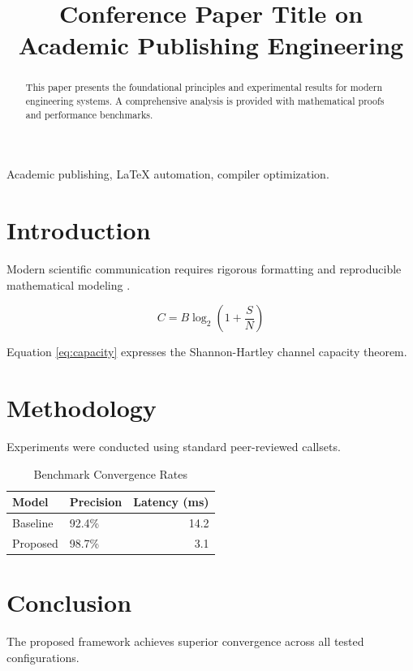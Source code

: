 \documentclass[conference]{IEEEtran}
\begin{document}
\title{Conference Paper Title on Academic Publishing Engineering}

\author{
\and
{}
}

\maketitle

\begin{abstract}
This paper presents the foundational principles and experimental results for modern engineering systems. A comprehensive analysis is provided with mathematical proofs and performance benchmarks.
\end{abstract}

\begin{IEEEkeywords}
Academic publishing, LaTeX automation, compiler optimization.
\end{IEEEkeywords}

\section{Introduction}
Modern scientific communication requires rigorous formatting and reproducible mathematical modeling \cite{shannon1948}.

\begin{equation}
  C = B \log_2\left(1 + \frac{S}{N}\right)
  \label{eq:capacity}
\end{equation}

Equation \eqref{eq:capacity} expresses the Shannon-Hartley channel capacity theorem.

\section{Methodology}
Experiments were conducted using standard peer-reviewed callsets.

\begin{table}[htbp]
  \centering
  \caption{Benchmark Convergence Rates}
  \label{tab:results}
  \begin{tabular}{llr}
    \toprule
    Model & Precision & Latency (ms) \\
    \midrule
    Baseline & 92.4\% & 14.2 \\
    Proposed & 98.7\% & 3.1 \\
    \bottomrule
  \end{tabular}
\end{table}

\section{Conclusion}
The proposed framework achieves superior convergence across all tested configurations.



\end{document}
